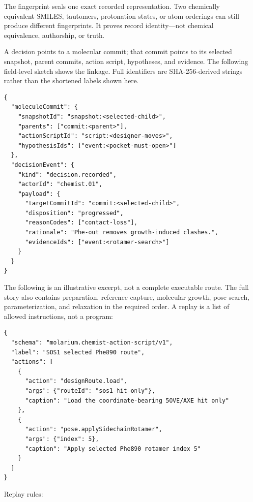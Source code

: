 The fingerprint seals one exact recorded representation. Two chemically
equivalent SMILES, tautomers, protonation states, or atom orderings can still
produce different fingerprints. It proves record identity---not chemical
equivalence, authorship, or truth.

A decision points to a molecular commit; that commit points to its selected
snapshot, parent commits, action script, hypotheses, and evidence. The following
field-level sketch shows the linkage. Full identifiers are SHA-256-derived
strings rather than the shortened labels shown here.

\noindent\begin{minipage}{\linewidth}
\small
\begin{verbatim}
{
  "moleculeCommit": {
    "snapshotId": "snapshot:<selected-child>",
    "parents": ["commit:<parent>"],
    "actionScriptId": "script:<designer-moves>",
    "hypothesisIds": ["event:<pocket-must-open>"]
  },
  "decisionEvent": {
    "kind": "decision.recorded",
    "actorId": "chemist.01",
    "payload": {
      "targetCommitId": "commit:<selected-child>",
      "disposition": "progressed",
      "reasonCodes": ["contact-loss"],
      "rationale": "Phe-out removes growth-induced clashes.",
      "evidenceIds": ["event:<rotamer-search>"]
    }
  }
}
\end{verbatim}
\end{minipage}

The following is an illustrative excerpt, not a complete executable route. The
full story also contains preparation, reference capture, molecular growth, pose
search, parameterization, and relaxation in the required order. A replay is a
list of allowed instructions, not a program:

\noindent\begin{minipage}{\linewidth}
\small
\begin{verbatim}
{
  "schema": "molarium.chemist-action-script/v1",
  "label": "SOS1 selected Phe890 route",
  "actions": [
    {
      "action": "designRoute.load",
      "args": {"routeId": "sos1-hit-only"},
      "caption": "Load the coordinate-bearing 5OVE/AXE hit only"
    },
    {
      "action": "pose.applySidechainRotamer",
      "args": {"index": 5},
      "caption": "Apply selected Phe890 rotamer index 5"
    }
  ]
}
\end{verbatim}
\end{minipage}

Replay rules:

